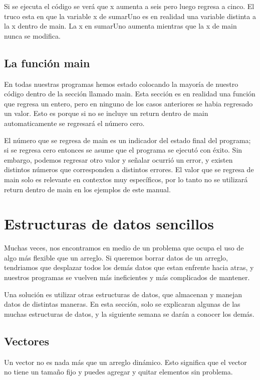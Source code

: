 \documentclass{article}
\begin{document}
Si se ejecuta el código se verá que x aumenta a seis pero luego regresa a cinco. El truco esta en que la variable x de sumarUno es en realidad una variable distinta a la x dentro de main. La x en sumarUno aumenta mientras que la x de main nunca se modifica.

\subsection{La función main}

En todas nuestras programas hemos estado colocando la mayoría de nuestro código dentro de la sección llamado main. Esta sección es en realidad una función que regresa un entero, pero en ninguno de los casos anteriores se habia regresado un valor. Esto es porque si no se incluye un return dentro de main automaticamente se regresará el número cero.

El número que se regresa de main es un indicador del estado final del programa; si se regresa cero entonces se asume que el programa se ejecutó con éxito. Sin embargo, podemos regresar otro valor y señalar ocurrió un error, y existen distintos números que corresponden a distintos errores. El valor que se regresa de main solo es relevante en contextos muy específicos, por lo tanto no se utilizará return dentro de main en los ejemplos de este manual.

\section{Estructuras de datos sencillos}

Muchas veces, nos encontramos en medio de un problema que ocupa el uso de algo más flexible que un arreglo. Si queremos borrar datos de un arreglo, tendriamos que desplazar todos los demás datos que estan enfrente hacia atras, y nuestros programas se vuelven más ineficientes y más complicados de mantener.

Una solución es utilizar otras estructuras de datos, que almacenan y manejan datos de distintas maneras. En esta sección, solo se explicaran algunas de las muchas estructuras de datos, y la siguiente semana se darán a conocer los demás.

\subsection{Vectores}

Un vector no es nada más que un arreglo dinámico. Esto significa que el vector no tiene un tamaño fijo y puedes agregar y quitar elementos sin problema.
\end{document}
